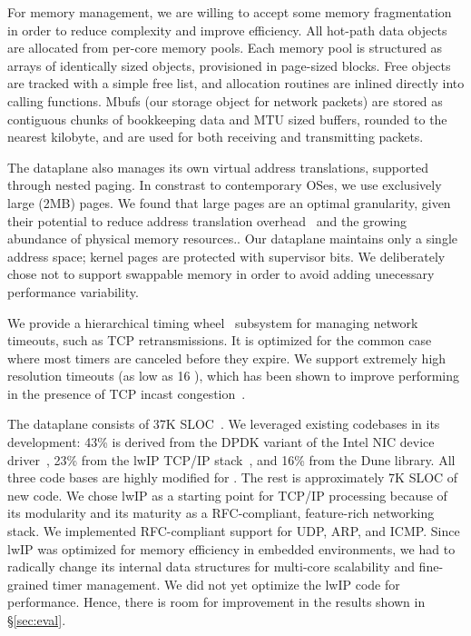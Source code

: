 For memory management, we are willing to accept some memory fragmentation in order
to reduce complexity and improve efficiency. All hot-path data objects are allocated from
per-core memory pools. Each memory pool is structured as arrays
of identically sized objects, provisioned in page-sized blocks. Free objects
are tracked with a simple free list, and allocation routines are
inlined directly into calling functions. Mbufs (our storage object
for network packets) are stored as contiguous chunks of bookkeeping
data and MTU sized buffers, rounded to the nearest
kilobyte, and are used for both receiving and transmitting packets.

The dataplane also manages its own virtual address translations, supported
through nested paging. In constrast to contemporary OSes, we use exclusively
large (2MB) pages. We found that large pages are an optimal granularity,
given their potential to reduce address translation overhead~\cite{DBLP:conf/isca/BasuGCHS13, dune}
and the growing abundance of physical memory resources.. Our dataplane maintains
only a single address space; kernel pages are protected with
supervisor bits. We deliberately chose not to support swappable memory
in order to avoid adding unecessary performance variability.

We provide a hierarchical timing wheel~\cite{DBLP:conf/sosp/VargheseL87} subsystem
for managing network timeouts, such as TCP retransmissions. It is optimized
for the common case where most timers are canceled before they expire. We support
extremely high resolution timeouts (as low as 16 \microsecond), which has been
shown to improve performing in the presence of TCP incast congestion~\cite{DBLP:conf/sigcomm/VasudevanPSKAGGM09}.

The dataplane consists of  37K SLOC~\cite{url:sloccount}.  We
leveraged existing codebases in its development: 43\% is derived from
the DPDK variant of the Intel NIC device driver~\cite{intel:dpdk},
23\% from the lwIP TCP/IP stack~\cite{dunkels2001design}, and 16\%
from the Dune library.  All three code bases are highly modified for
\ix. The rest is approximately 7K SLOC of new code. We chose lwIP as a
starting point for TCP/IP processing because of its modularity and its
maturity as a RFC-compliant, feature-rich networking stack. We
implemented RFC-compliant support for UDP, ARP, and ICMP.
Since lwIP was optimized for memory efficiency in embedded
environments, we had to radically change its internal data structures
for multi-core scalability and fine-grained timer management. We did not
yet optimize the lwIP code for performance. Hence, there is room for
improvement in the results shown in \S\ref{sec:eval}.

